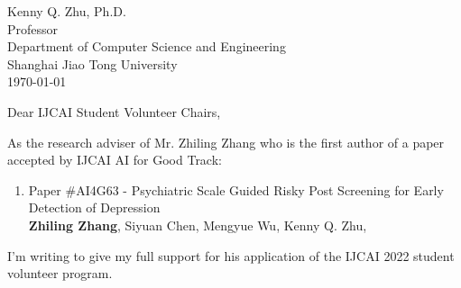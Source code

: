 \documentclass[11pt]{article}
\begin{document}
Kenny Q. Zhu, Ph.D.\\
Professor\\
Department of Computer Science and Engineering \\
Shanghai Jiao Tong University \\

\noindent\today 
\hfill 
{}
\vspace{1cm}


Dear IJCAI Student Volunteer Chairs,
\vspace{0.2cm}

As the research adviser of Mr. Zhiling Zhang who is the first author of a paper accepted by IJCAI AI for Good Track:

\begin{enumerate}
    \item Paper \#AI4G63 - Psychiatric Scale Guided Risky Post Screening for Early Detection of Depression\\
    \textbf{Zhiling Zhang}, Siyuan Chen, Mengyue Wu, Kenny Q. Zhu,
\end{enumerate}
I'm writing to give my full support for his application of the IJCAI 2022 student volunteer program.
\end{document}
